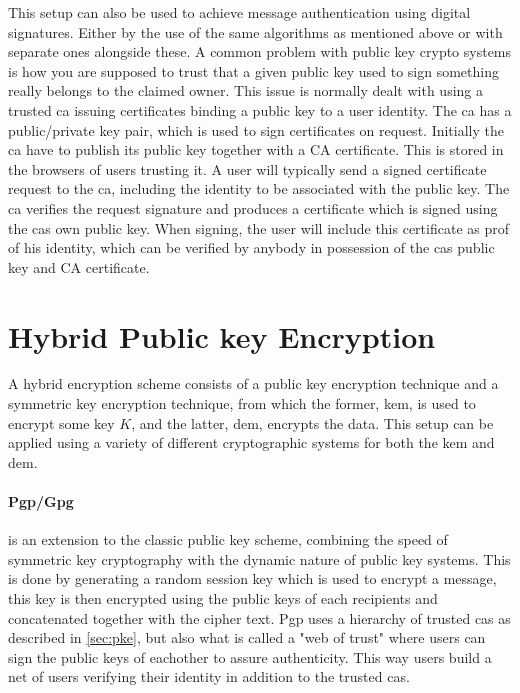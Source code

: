 This setup can also be used to achieve message authentication using digital signatures. Either by the use of the same algorithms as mentioned above or with separate ones alongside these. A common problem with public key crypto systems is how you are supposed to trust that a given public key used to sign something really belongs to the claimed owner. This issue is normally dealt with using a trusted \gls{ca} issuing certificates binding a public key to a user identity. The \gls{ca} has a public/private key pair, which is used to sign certificates on request. Initially the \gls{ca} have to publish its public key together with a CA certificate. This is stored in the browsers of users trusting it. A user will typically send a signed certificate request to the \gls{ca}, including the identity to be associated with the public key. The \gls{ca} verifies the request signature and produces a certificate which is signed using the \glspl{ca} own public key. When signing, the user will include this certificate as prof of his identity, which can be verified by anybody in possession of the \glspl{ca} public key and CA certificate. 




\section{Hybrid Public key Encryption}\label{sec:hybrid}
A hybrid encryption scheme \cite{hybrid_enc} consists of a public key encryption technique and a symmetric key encryption technique, from which the former, \gls{kem}, is used to encrypt some key $K$, and the latter, \gls{dem}, encrypts the data. This setup can be applied using a variety of different cryptographic systems for both the \gls{kem} and \gls{dem}. 

\paragraph{Pgp/Gpg}\label{pgp}\cite{openpgp, koch2003gnu} is an extension to the classic public key scheme, combining the speed of symmetric key cryptography with the dynamic nature of public key systems. This is done by generating a random session key which is used to encrypt a message, this key is then encrypted using the public keys of each recipients and concatenated together with the cipher text. Pgp uses a hierarchy of trusted \glspl{ca} as described in \ref{sec:pke}, but also what is called a "web of trust" where users can sign the public keys of eachother to assure authenticity. This way users build a net of users verifying their identity in addition to the trusted \glspl{ca}.

